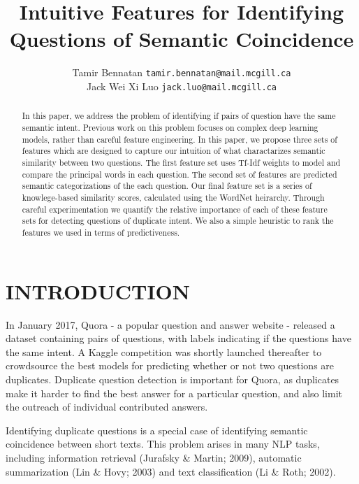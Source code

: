 \documentclass[letterpaper, 10 pt, conference]{ieeeconf}  %
\title{\LARGE \bf
Intuitive Features for Identifying Questions of Semantic Coincidence
}
\author{ \parbox{3 in}{\centering Tamir Bennatan
         {\tt\small tamir.bennatan@mail.mcgill.ca}}
         \hspace*{ 0.5 in}
         \parbox{3 in}{ \centering Jack Wei Xi Luo
         \break
         {\tt\small jack.luo@mail.mcgill.ca}}
}
\begin{document}
\maketitle
\thispagestyle{empty}
\pagestyle{empty}


\begin{abstract}

In this paper, we address the problem of identifying if pairs of question have the same semantic intent. Previous work on this problem focuses on complex deep learning models, rather than careful feature engineering. In this paper, we propose three sets of features which are designed to capture our intuition of what charactarizes semantic similarity between two questions. The first feature set uses Tf-Idf weights to model and compare the principal words in each question. The second set of features are predicted semantic categorizations of the each question. Our final feature set is a series of  knowlege-based similarity scores, calculated using the WordNet heirarchy. Through careful experimentation we quantify the relative importance of each of these feature sets for detecting questions of duplicate intent. We also a simple heuristic to rank the features we used in terms of predictiveness. 

\end{abstract}


\section{INTRODUCTION}

In January 2017, Quora - a popular question and answer website - released a dataset containing pairs of questions, with labels indicating if the questions have the same intent. A Kaggle competition was shortly launched thereafter to crowdsource the best models for predicting whether or not two questions are duplicates. Duplicate question detection is important for Quora, as duplicates make it harder to find the best answer for a particular question, and also limit the outreach of individual contributed answers.

Identifying duplicate questions is a special case of identifying semantic coincidence between short texts. This problem arises in many NLP tasks, including information retrieval (Jurafsky \& Martin; 2009), automatic summarization (Lin \& Hovy; 2003) and text classification (Li \& Roth; 2002). 
\end{document}

